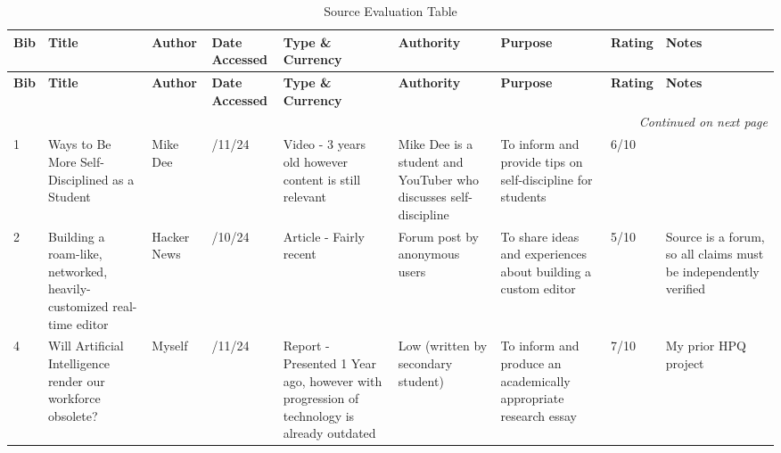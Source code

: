 {\footnotesize
\begin{longtable}{|p{0.4cm}|>{\raggedright\arraybackslash}p{2.2cm}|>{\raggedright\arraybackslash}p{1.5cm}|>{\raggedright\arraybackslash}p{1.2cm}|>{\raggedright\arraybackslash}p{1.8cm}|>{\raggedright\arraybackslash}p{1.8cm}|>{\raggedright\arraybackslash}p{1.8cm}|p{1cm}|>{\raggedright\arraybackslash}p{1cm}|}
\caption{Source Evaluation Table} \\
\toprule
\textbf{Bib} & \textbf{Title} & \textbf{Author} & \textbf{Date Accessed} & \textbf{Type \& Currency} & \textbf{Authority} & \textbf{Purpose} & \textbf{Rating} & \textbf{Notes}  \\
\midrule
\endfirsthead

\toprule
\textbf{Bib} & \textbf{Title} & \textbf{Author} & \textbf{Date Accessed} & \textbf{Type \& Currency} & \textbf{Authority} & \textbf{Purpose} & \textbf{Rating} & \textbf{Notes}  \\
\midrule
\endhead

\midrule
\multicolumn{9}{r}{\emph{Continued on next page}} \\
\bottomrule
\endfoot

\bottomrule
\endlastfoot

1 & 13 Ways to Be More Self-Disciplined as a Student & Mike Dee & 18/11/24 & Video - 3 years old however content is still relevant & Mike Dee is a student and YouTuber who discusses self-discipline & To inform and provide tips on self-discipline for students & 6/10 &\\

2 & Building a roam-like, networked, heavily-customized real-time editor & Hacker News & 21/10/24 & Article -  Fairly recent & Forum post by anonymous users & To share ideas and experiences about building a custom editor & 5/10 & Source is a forum, so all claims must be independently verified\\


4 & Will Artificial Intelligence render our workforce obsolete? & Myself & 9/11/24 & Report - Presented 1 Year ago, however with progression of technology is already outdated
 & Low (written by secondary student)
 & To inform and produce an academically appropriate research essay
 & 7/10 & My prior HPQ project\\



\end{longtable}}

